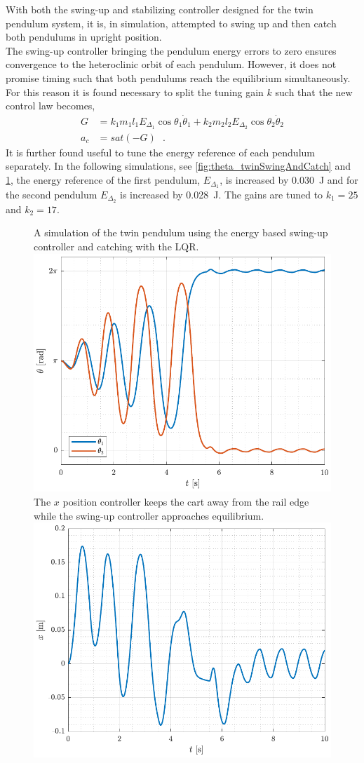 %
With both the swing-up and stabilizing controller designed for the twin pendulum system, it is, in simulation, attempted to swing up and then catch both pendulums in upright position.\\
The swing-up controller bringing the pendulum energy errors to zero ensures convergence to the heteroclinic orbit of each pendulum. However, it does not promise timing such that both pendulums reach the equilibrium simultaneously. For this reason it is found necessary to split the tuning gain $k$ such that the new control law becomes,
\begin{align}
  G &= k_1 m_1 l_1 E_{\Delta_1} \cos \theta_1 \dot{\theta}_1 +  k_2 m_2 l_2 E_{\Delta_2} \cos \theta_2 \dot{\theta}_2  \label{eq:2k_lyapunovDerivativeTwinG} \\
  a_c &= sat( - G ) \ \ \ .  \label{eq:2k_twinSwingControl1}
\end{align}
%
It is further found useful to tune the energy reference of each pendulum separately. In the following simulations, see \autoref{fig:theta_twinSwingAndCatch} and \ref{fig:x_twinSwingAndCatch}, the energy reference of the first pendulum, $E_{\Delta_1}$, is increased by \SI{0.030}{J} and for the second pendulum $E_{\Delta_2}$ is increased by \SI{0.028}{J}. The gains are tuned to $k_1 = 25$ and $k_2 = 17$.
%
\begin{figure}[H]
  \hspace{-10pt}
  \captionbox 
  {
    A simulation of the twin pendulum using the energy based swing-up controller and catching with the LQR.
    \label{fig:theta_twinSwingAndCatch}
  }
  {
    \hspace{-1cm}
    \includegraphics[width=.46\textwidth]{figures/theta_twinSwingAndCatch}
  }
  \hspace{20pt}
  \captionbox 
  {
    The $x$ position controller keeps the cart away from the rail edge while the swing-up controller approaches equilibrium.
    \label{fig:x_twinSwingAndCatch}
  }
  {
    \hspace{-1cm}
    \includegraphics[width=.46\textwidth]{figures/x_twinSwingAndCatch}
  }
\end{figure}
